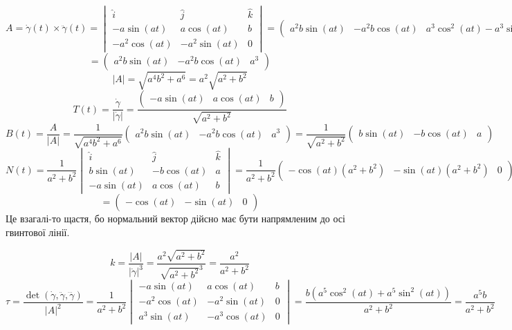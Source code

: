 \documentclass[10pt, a4paper]{article} %
\begin{document}
\[A = \dot\gamma(t) \times \ddot\gamma(t) = \begin{vmatrix}
    \hat i & \hat j & \hat k  \\ -a\sin(at) & a\cos(at) & b \\ -a^2\cos(at) & -a^2\sin(at) & 0
\end{vmatrix} = \begin{pmatrix}
    a^2b\sin(at) & -a^2b\cos(at) & a^3\cos^2(at)-a^3\sin^2(at)
\end{pmatrix} = \]
\[= \begin{pmatrix}
    a^2b\sin(at) & -a^2b\cos(at) & a^3
\end{pmatrix} \]
\[|A| = \sqrt{a^4b^2+a^6} = a^2\sqrt{a^2+b^2}\]
\[T(t) = \frac{\dot \gamma}{|\dot\gamma|} = \frac{\begin{pmatrix}-a\sin(at) & a\cos(at) & b\end{pmatrix}}{\sqrt{a^2+b^2}}\]
\[B(t) = \frac{A}{|A|} = \frac{1}{\sqrt{a^4b^2+a^6}}\begin{pmatrix}
    a^2b\sin(at) & -a^2b\cos(at) & a^3
\end{pmatrix} = \frac{1}{\sqrt{a^2+b^2}}\begin{pmatrix}
    b\sin(at) & -b\cos(at) & a
\end{pmatrix}\]
\[N(t) = \frac{1}{a^2+b^2}\begin{vmatrix}
    \hat i & \hat j & \hat k \\ b\sin(at) & -b\cos(at) & a \\ -a\sin(at) & a\cos(at) & b
\end{vmatrix} = \frac{1}{a^2+b^2}\begin{pmatrix}
    -\cos(at)(a^2+b^2) & -\sin(at)(a^2+b^2) & 0
\end{pmatrix} = \]
\[= \begin{pmatrix}
    -\cos(at) & -\sin(at) & 0
\end{pmatrix}\]
Це взагалі-то щастя, бо нормальний вектор дійсно має бути напрямленим до осі гвинтової лінії.

\[k = \frac{|A|}{|\dot\gamma|^3} = \frac{a^2\sqrt{a^2+b^2}}{\sqrt{a^2+b^2}^3} = \frac{a^2}{a^2+b^2}\]
\[\tau = \frac{\det(\dot\gamma, \ddot\gamma, \dddot\gamma)}{|A|^2} = \frac{1}{a^2+b^2}\begin{vmatrix}
    -a\sin(at) & a\cos(at) & b \\ -a^2\cos(at) & -a^2\sin(at) & 0 \\ a^3\sin(at) & -a^3\cos(at) & 0
\end{vmatrix} = \frac{b(a^5\cos^2(at)+a^5\sin^2(at))}{a^2+b^2} = \frac{a^5b}{a^2+b^2}\]
\end{document}
